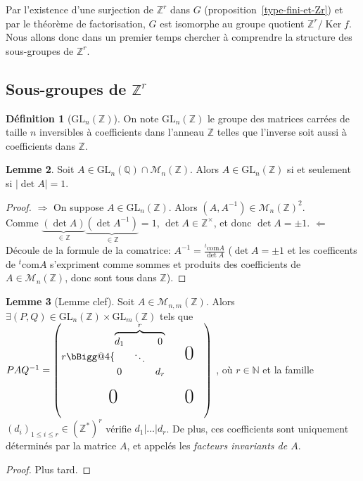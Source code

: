 \documentclass{report}
\makeatletter
\newcommand{\Q}{\mathbb{Q}}
\newcommand{\Z}{\mathbb{Z}}
\newcommand{\N}{\mathbb{N}}
\renewcommand{\ker}{\mathop{\mathrm{Ker}}\nolimits}
\newcommand{\direct}{\textcircled{$\Rightarrow$} }
\newcommand{\reciproque}{\textcircled{$\Leftarrow$} }
\newcommand{\x}{\times}
\theoremstyle{definition}
\newtheorem{defi}{Définition}[chapter]
\newtheorem{lem}[defi]{Lemme}
\newcommand{\biggg}{\bBigg@{4}}
\makeatother
\begin{document}
Par l'existence d'une surjection de $\Z^r$ dans $G$ (proposition~\ref{type-fini-et-Zr}) et par le théorème de factorisation, $G$ est isomorphe au groupe quotient $\Z^r/\ker f$. Nous allons donc dans un premier temps chercher à comprendre la structure des sous-groupes de $\Z^r$.

\subsection{Sous-groupes de $\Z^r$}

\begin{defi}[$\textrm{GL}_n(\Z)$]
On note $\textrm{GL}_n(\Z)$ le groupe des matrices carrées de taille $n$ inversibles à coefficients dans l'anneau $\Z$ telles que l'inverse soit aussi à coefficients dans $\Z$.
\end{defi}

\begin{lem}
Soit $A \in \textrm{GL}_n(\Q) \cap \mathcal{M}_n(\Z)$. Alors $A \in \textrm{GL}_n(\Z)$ si et seulement si $\vert \det A \vert =1$.
\end{lem}
\begin{proof}
\direct On suppose $A \in \textrm{GL}_n(\Z)$. Alors $(A, A^{-1}) \in \mathcal{M}_n(\Z)^2$.\\
Comme $\underbrace{(\det A)}_{\in \Z}\underbrace{(\det A^{-1})}_{\in \Z}=1$, $\det A\in\Z^\x$, et donc $\det A=\pm 1$.\smallbreak
\reciproque D\'ecoule de la formule de la comatrice: $A^{-1}=\frac{^t\textrm{com}A}{\det A}$ ($\det A=\pm 1$ et les coefficents de $^t\textrm{com}A$ s'expriment comme sommes et produits des coefficients de $A\in \mathcal{M}_n(\Z)$, donc sont tous dans $\Z$).
\end{proof}

\begin{lem}[Lemme clef]\label{lemme-clef}
Soit $A \in \mathcal{M}_{n,m}(\Z)$. Alors $\exists(P,Q) \in \textrm{GL}_n(\Z)\x\textrm{GL}_m(\Z)$ tels que $PAQ^{-1}=
\begin{pmatrix}
	r\biggg\{\overbrace{
		\begin{matrix}d_1&&0\\
	  	&\ddots\\
      	0&&d_r\end{matrix}
	}^{r} && \text{\huge0}&\\
	&\\
    \text{\huge0} && \text{\huge0}\\
	&
\end{pmatrix}$
, où $ r \in \N$ et la famille $(d_i)_{1 \leqslant i \leqslant r} \in (\Z^*)^r$ vérifie $d_1 \vert \ldots \vert d_r$. De plus, ces coefficients sont uniquement déterminés par la matrice $A$, et appelés les \textit{facteurs invariants de $A$}.
\end{lem}
\begin{proof}
Plus tard.
\end{proof}
\end{document}
